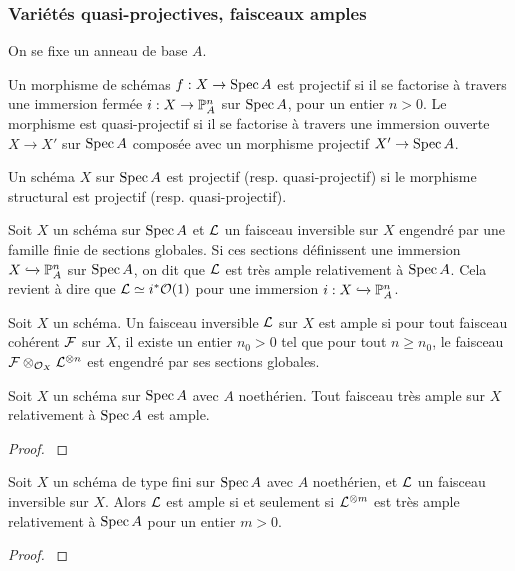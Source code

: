 \subsubsection{Variétés quasi-projectives, faisceaux amples}

\noindent On se fixe un anneau de base $A$.

\begin{defn}
Un morphisme de schémas $f:X\rightarrow \operatorname{Spec} A$ est projectif si il se factorise à travers une immersion fermée $i:X\rightarrow \mathbb{P}_A^n$ sur $\operatorname{Spec} A$, pour un entier $n>0$. Le morphisme est quasi-projectif si il se factorise à travers une immersion ouverte $X\rightarrow X'$ sur $\operatorname{Spec} A$ composée avec un morphisme projectif $X'\rightarrow \operatorname{Spec} A$.
\end{defn}


\begin{defn}
Un schéma $X$ sur $\operatorname{Spec} A$ est projectif (resp. quasi-projectif) si le morphisme structural est projectif (resp. quasi-projectif).
\end{defn}

\begin{defn}
Soit $X$ un schéma sur $\operatorname{Spec} A$ et $\mathcal{L}$ un faisceau inversible sur $X$ engendré par une famille finie de sections globales. Si ces sections définissent une immersion $X\xhookrightarrow{}\mathbb{P}_A^n$ sur $\operatorname{Spec} A$, on dit que $\mathcal{L}$ est très ample relativement à $\operatorname{Spec} A$. Cela revient à dire que $\mathcal{L}\simeq i^*\mathcal{O}(1)$  pour une immersion $i:X\xhookrightarrow{}\mathbb{P}_A^n$.
\end{defn}

\begin{defn}
Soit $X$ un schéma. Un faisceau inversible $\mathcal{L}$ sur $X$ est ample si pour tout faisceau cohérent $\mathcal{F}$ sur $X$, il existe un entier $n_0>0$ tel que pour tout $n\geq n_0$, le faisceau $\mathcal{F}\otimes_{\mathcal{O}_X}\mathcal{L}^{\otimes n}$ est engendré par ses sections globales.
\end{defn}

\begin{prop}
Soit $X$ un schéma sur $\operatorname{Spec} A$ avec $A$ noethérien. Tout faisceau très ample sur $X$ relativement à $\operatorname{Spec} A$ est ample.
\end{prop}
\begin{proof}
\cite[II.5.17]{Hartshorne} 
\end{proof}

\begin{thm}
Soit $X$ un schéma de type fini sur $\operatorname{Spec} A$ avec $A$ noethérien, et $\mathcal{L}$ un faisceau inversible sur $X$. Alors $\mathcal{L}$ est ample si et seulement si $\mathcal{L}^{\otimes m}$ est très ample relativement à $\operatorname{Spec} A$ pour un entier $m>0$.
\end{thm}
\begin{proof}
\cite[II.7.6]{Hartshorne}
\end{proof}


